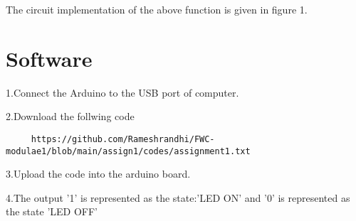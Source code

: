 \documentclass[10pt, a4paper]{article}
\begin{document}
The circuit implementation of the above function is given in figure 1.


 \section{Software}
  1.Connect the Arduino to the USB port of computer.
  
  2.Download the follwing code
  
  \begin{lstlisting}
     https://github.com/Rameshrandhi/FWC-modulae1/blob/main/assign1/codes/assignment1.txt
  \end{lstlisting}
  
  3.Upload the code into the arduino board.
 
  4.The output '1' is represented as the state:'LED ON' and '0' is represented as the state 'LED OFF' 
 
\end{document}
